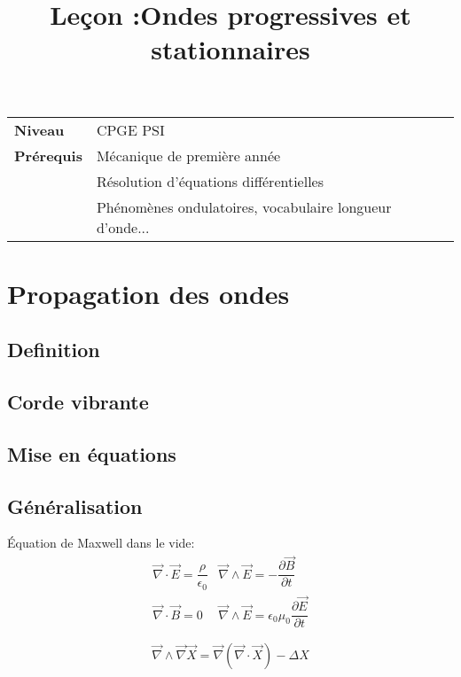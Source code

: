 \documentclass[10pt]{beamer}
\title{Leçon :Ondes progressives et stationnaires}
\begin{document}
\begin{frame}{}
    \titlepage

    \begin{tabularx}{\textwidth}{l@{:\,\,}X}
        \textbf{Niveau} 	  & CPGE PSI\\
        \textbf{Prérequis} & Mécanique de première année \\
        & Résolution d'équations différentielles \\
        & Phénomènes ondulatoires, vocabulaire longueur d'onde...
    \end{tabularx}
\end{frame}

\begin{frame}
    \tableofcontents
\end{frame}

\section{Propagation des ondes}
\subsection{Definition}
\subsection{Corde vibrante}
\subsection{Mise en équations}
\subsection{Généralisation}
\begin{frame}{\insertsubsection}
    Équation de Maxwell dans le vide: 
    \begin{equation}
        \begin{array}{cc}
            \vec{\nabla}\cdot \vec{E} = \dfrac{\rho}{\epsilon_0} & \vec{\nabla}\wedge \vec{E} = -\dfrac{\partial \vec{B}}{\partial t}\\
            \vec{\nabla}\cdot \vec{B} =0 &   \vec{\nabla}\wedge \vec{E} = \epsilon_0\mu_0\dfrac{\partial \vec{E}}{\partial t}
        \end{array}
    \end{equation}

    $$\vec{\nabla} \wedge \vec{\nabla} \vec{X} = \vec{\nabla}\left(\vec{\nabla}\cdot \vec{X}\right) - \Delta X$$
\end{frame}
\end{document}
